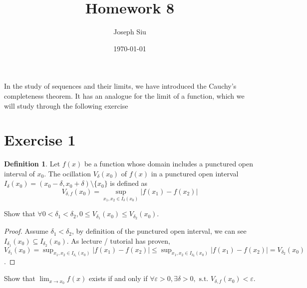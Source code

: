 \documentclass{homework}
\author{Joseph Siu}
\date{\today}
\title{Homework 8}
\newcommand{\ra}{\rightarrow}
\newcommand{\?}{\stackrel{?}{=}}
\newcommand{\ep}{\varepsilon}
\theoremstyle{definition}
\newtheorem*{definition}{Definition}
\begin{document}
 \maketitle

In the study of sequences and their limits, we have introduced the Cauchy's completeness theorem. It has an analogue for the limit of a function, which we will study through the following exercise

\section*{Exercise 1}
\begin{definition}
    Let $f(x)$ be a function whose domain includes a punctured open interval of $x_0$. The ocillation $V_\delta(x_0)$ of $f(x)$ in a punctured open interval \(I_\delta(x_0)=(x_0-\delta,x_0+\delta)\setminus\{x_0\}\) is defined as \[V_{\delta,f}(x_0)=\sup_{x_1,x_2\in I_\delta(x_0)}|f(x_1)-f(x_2)|\]
\end{definition}

\question[1] Show that $\forall 0<\delta_1<\delta_2, 0\leq V_{\delta_1}(x_0) \leq V_{\delta_2}(x_0)$.

\begin{proof}
    Assume \( \delta_1<\delta_2 \), by definition of the punctured open interval, we can see \(I_{\delta_1}(x_0)\subseteq I_{\delta_2}(x_0)\). As lecture / tutorial has proven, \(V_{\delta_1}(x_0)=\sup_{x_1,x_2\in I_{\delta_1}(x_0)}|f(x_1)-f(x_2)|\leq \sup_{x_1,x_2\in I_{\delta_2}(x_0)}|f(x_1)-f(x_2)|=V_{\delta_2}(x_0)\).
\end{proof}

\question[2] Show that \( \lim_{x\ra x_0} f(x)\) exists if and only if \(\forall \ep > 0, \exists \delta>0, \text{ s.t. } V_{\delta,f}(x_0)<\ep.\)
\end{document}
